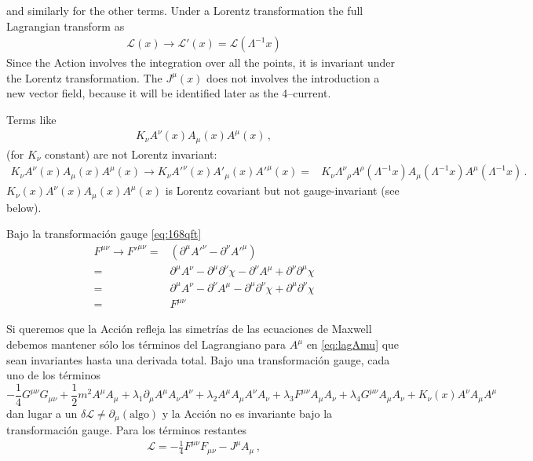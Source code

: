 and similarly for the other terms. Under a Lorentz transformation the full Lagrangian transform as
\begin{align}
  \mathcal{L}(x)\to\mathcal{L}'(x)=\mathcal{L}(\Lambda^{-1}x) 
\end{align}
Since the Action involves the integration over all the points, it is invariant under the Lorentz transformation. The $J^\mu(x)$ does not involves the introduction a new vector field, because it will be identified later as the 4--current.


Terms like
\begin{align}
  K_\nu A^\nu(x) A_\mu(x) A^\mu(x)\,,
\end{align}
(for $K_\nu$ constant) are not Lorentz invariant:
\begin{align}
  K_\nu A^\nu(x) A_\mu(x) A^\mu(x)\to K_\nu{A'}^\nu(x) {A'}_\mu(x) {A'}^\mu(x)=& K_\nu{\Lambda^\nu}_\rho A^\rho\left(\Lambda^{-1}x\right) A_\mu\left(\Lambda^{-1}x\right) A^\mu\left(\Lambda^{-1}x\right)\,.
\end{align}
$K_\nu(x)A^\nu(x)A_\mu(x)A^\mu(x)$ is Lorentz covariant but not gauge-invariant (see below).

Bajo la transformación gauge \eqref{eq:168qft}
\begin{align}
  \label{eq:fmunutrans}
  F^{\mu\nu}\to{F'}^{\mu\nu}=&(\partial^\mu{A'}^\nu-\partial^\nu{A'}^\mu)\nonumber\\
  =&\partial^\mu A^\nu-\partial^\mu\partial^\nu\chi-\partial^\nu A^\mu+\partial^\nu\partial^\mu\chi\nonumber\\
  =&\partial^\mu A^\nu-\partial^\nu A^\mu-\partial^\mu\partial^\nu\chi+\partial^\mu\partial^\nu\chi\nonumber\\
  =&F^{\mu\nu}
\end{align}

Si queremos que la Acción refleja las simetrías de las ecuaciones de
Maxwell debemos mantener sólo los términos del Lagrangiano para $A^\mu$
en \eqref{eq:lagAmu} que sean invariantes hasta una derivada total. Bajo una transformación gauge, cada
uno de los términos
\begin{equation*}
  -\frac{1}{4}G^{\mu\nu}G_{\mu\nu}+
  \frac{1}{2}m^2A^\mu A_\mu+\lambda_1\partial_\mu A^\mu A_\nu A^\nu+\lambda_2 A^\mu A_\mu A^\nu A_\nu+\lambda_3F^{\mu\nu}A_\mu A_\nu+\lambda_4G^{\mu\nu}A_\mu A_\nu
+K_\nu(x) A^\nu A_\mu A^\mu
\end{equation*}
dan lugar a un $\delta\mathcal{L}\neq\partial_\mu(\text{algo})$ y la Acción no es
invariante bajo la transformación gauge. Para los 
términos restantes
\begin{align}
    \mathcal{L}=-\frac{1}{4}F^{\mu\nu}F_{\mu\nu}-J^\mu A_\mu\,,
\end{align}

